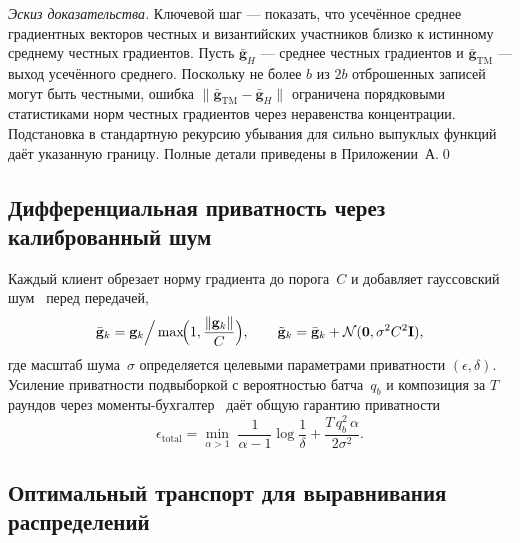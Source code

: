 \noindent\textit{Эскиз доказательства.} Ключевой шаг --- показать, что усечённое среднее градиентных векторов честных и византийских участников близко к истинному среднему честных градиентов. Пусть $\bar{\mathbf{g}}_H$ --- среднее честных градиентов и $\bar{\mathbf{g}}_{\mathrm{TM}}$ --- выход усечённого среднего. Поскольку не более $b$ из $2b$ отброшенных записей могут быть честными, ошибка $\|\bar{\mathbf{g}}_{\mathrm{TM}}-\bar{\mathbf{g}}_H\|$ ограничена порядковыми статистиками норм честных градиентов через неравенства концентрации. Подстановка в стандартную рекурсию убывания для сильно выпуклых функций даёт указанную границу. Полные детали приведены в Приложении~А.\qed

\subsection{Дифференциальная приватность через калиброванный шум}

Каждый клиент обрезает норму градиента до порога~$C$ и добавляет гауссовский шум~\cite{Abadi2016,Dwork2006,Dwork2014} перед передачей,
\begin{equation}
\bar{\mathbf{g}}_k = \mathbf{g}_k\Big/\max\!\Bigl(1,\frac{\|\mathbf{g}_k\|}
{C}\Bigr),
\qquad
\tilde{\mathbf{g}}_k = \bar{\mathbf{g}}_k + \mathcal{N}(\mathbf{0},\sigma^2 C^2\mathbf{I}),
\label{eq:fed_dp_noise}
\end{equation}
где масштаб шума~$\sigma$ определяется целевыми параметрами приватности $(\epsilon,\delta)$. Усиление приватности подвыборкой с вероятностью батча~$q_b$ и композиция за $T$ раундов через моменты-бухгалтер~\cite{Mironov2017,Balle2018} даёт общую гарантию приватности
\begin{equation}
\epsilon_{\mathrm{total}}
= \min_{\alpha>1}\;
  \frac{1}{\alpha-1}\log\frac{1}{\delta}
  + \frac{T\,q_b^2\,\alpha}{2\sigma^2}.
\label{eq:fed_privacy}
\end{equation}

\subsection{Оптимальный транспорт для выравнивания распределений}

